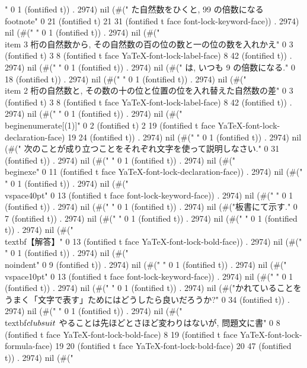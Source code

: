 " 0 1 (fontified t)) . 2974) nil (#("	 た自然数をひくと, 99 の倍数になる\\footnote{" 0 21 (fontified t) 21 31 (fontified t face font-lock-keyword-face)) . 2974) nil (#("
" 0 1 (fontified t)) . 2974) nil (#("   \\item 3 桁の自然数から, その自然数の百の位の数と一の位の数を入れかえ" 0 3 (fontified t) 3 8 (fontified t face YaTeX-font-lock-label-face) 8 42 (fontified t)) . 2974) nil (#("
" 0 1 (fontified t)) . 2974) nil (#("	 は, いつも 9 の倍数になる." 0 18 (fontified t)) . 2974) nil (#("
" 0 1 (fontified t)) . 2974) nil (#("   \\item 2 桁の自然数と, その数の十の位と位置の位を入れ替えた自然数の差" 0 3 (fontified t) 3 8 (fontified t face YaTeX-font-lock-label-face) 8 42 (fontified t)) . 2974) nil (#("
" 0 1 (fontified t)) . 2974) nil (#("  \\begin{enumerate}[(1)]" 0 2 (fontified t) 2 19 (fontified t face YaTeX-font-lock-declaration-face) 19 24 (fontified t)) . 2974) nil (#("
" 0 1 (fontified t)) . 2974) nil (#("  次のことが成り立つことをそれぞれ文字を使って説明しなさい." 0 31 (fontified t)) . 2974) nil (#("
" 0 1 (fontified t)) . 2974) nil (#("\\begin{exe}" 0 11 (fontified t face YaTeX-font-lock-declaration-face)) . 2974) nil (#("
" 0 1 (fontified t)) . 2974) nil (#("\\vspace{40pt}" 0 13 (fontified t face font-lock-keyword-face)) . 2974) nil (#("
" 0 1 (fontified t)) . 2974) nil (#("
" 0 1 (fontified t)) . 2974) nil (#("板書にて示す." 0 7 (fontified t)) . 2974) nil (#("
" 0 1 (fontified t)) . 2974) nil (#("
" 0 1 (fontified t)) . 2974) nil (#("\\textbf{【解答】}" 0 13 (fontified t face YaTeX-font-lock-bold-face)) . 2974) nil (#("
" 0 1 (fontified t)) . 2974) nil (#("\\noindent" 0 9 (fontified t)) . 2974) nil (#("
" 0 1 (fontified t)) . 2974) nil (#("\\vspace{10pt}" 0 13 (fontified t face font-lock-keyword-face)) . 2974) nil (#("
" 0 1 (fontified t)) . 2974) nil (#("
" 0 1 (fontified t)) . 2974) nil (#("かれていることをうまく「文字で表す」ためにはどうしたら良いだろうか?" 0 34 (fontified t)) . 2974) nil (#("
" 0 1 (fontified t)) . 2974) nil (#("\\textbf{$\\clubsuit$} やることは先ほどとさほど変わりはないが, 問題文に書" 0 8 (fontified t face YaTeX-font-lock-bold-face) 8 19 (fontified t face YaTeX-font-lock-formula-face) 19 20 (fontified t face YaTeX-font-lock-bold-face) 20 47 (fontified t)) . 2974) nil (#("
}
